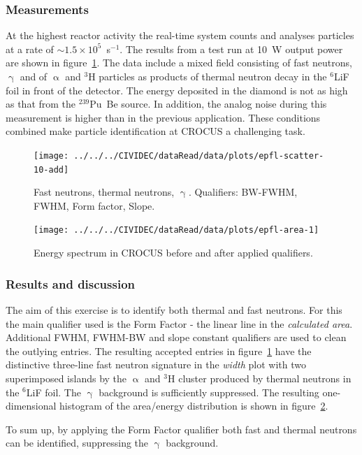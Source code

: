 \subsubsection{Measurements}
At the highest reactor activity the real-time system counts and analyses particles at a rate of $\sim1.5\times10^{5}$~s$^{-1}$. The results from a test run at 10~W output power are shown in figure~\ref{fig:scatterepfl2}. The data include a mixed field consisting of fast neutrons, $\upgamma$ and of $\upalpha$ and $^3$H particles as products of thermal neutron decay in the $^6$LiF foil in front of the detector. The energy deposited in the diamond is not as high as that from the $^{239}$Pu~Be source. In addition, the analog noise during this measurement is higher than in the previous application. These conditions combined make particle identification at CROCUS a challenging task.


\clearpage
\begin{figure}[]
\centering
\texttt{[image: ../../../CIVIDEC/dataRead/data/plots/epfl-scatter-10-add]}
\caption{Fast neutrons, thermal neutrons, $\upgamma$. Qualifiers: BW-FWHM, FWHM, Form factor, Slope.}
\label{fig:scatterepfl2}
\end{figure}

\clearpage
\begin{figure}[!t]
\centering
\texttt{[image: ../../../CIVIDEC/dataRead/data/plots/epfl-area-1]}
\caption{Energy spectrum in CROCUS before and after applied qualifiers.}
\label{fig:scatterepfl2area}
\end{figure}


\subsubsection{Results and discussion}
The aim of this exercise is to identify both thermal and fast neutrons. For this the main qualifier used is the Form Factor - the linear line in the \emph{calculated area}. Additional FWHM, FWHM-BW and slope constant qualifiers are used to clean the outlying entries. The resulting accepted entries in figure~\ref{fig:scatterepfl2} have the distinctive three-line fast neutron signature in the \emph{width} plot with two superimposed islands by the $\upalpha$ and $^3$H cluster produced by thermal neutrons in the $^6$LiF foil. The $\upgamma$ background is sufficiently suppressed. The resulting one-dimensional histogram of the area/energy distribution is shown in figure~\ref{fig:scatterepfl2area}.

To sum up, by applying the Form Factor qualifier both fast and thermal neutrons can be identified, suppressing the $\upgamma$ background.



